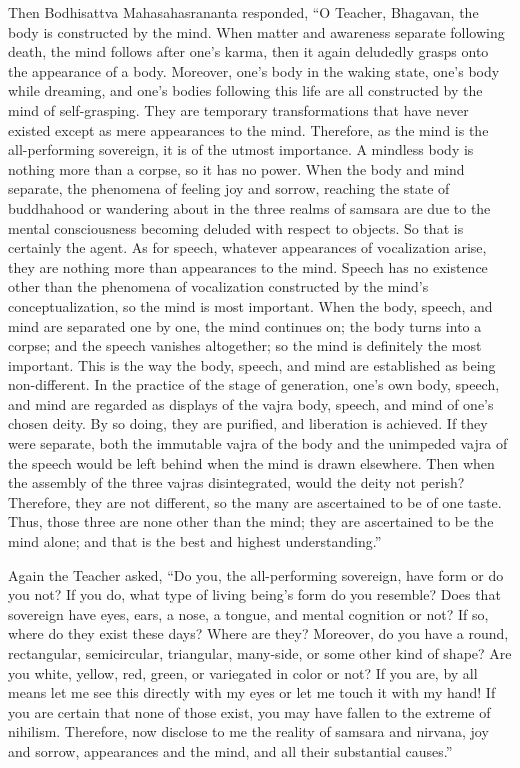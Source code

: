 \documentclass[a4paper,11pt,twoside,final]{book}
\begin{document}
Then Bodhisattva Mahasahasrananta responded, ``O Teacher, Bhaga\-van,
the body is constructed by the mind. When matter and awareness
separate following death, the mind follows after one's karma, then it
again deludedly grasps onto the appearance of a body. Moreover, one's
body in the waking state, one's body while dreaming, and one's bodies
following this life are all constructed by the mind of
self-grasping. They are temporary transformations that have never
existed except as mere appearances to the mind. Therefore, as the mind
is the all-performing sovereign, it is of the utmost importance.  A
mindless body is nothing more than a corpse, so it has no power. When
the body and mind separate, the phenomena of feeling joy and sorrow,
reaching the state of buddhahood or wandering about in the three
realms of samsara are due to the mental consciousness becoming deluded
with respect to objects. So that is certainly the agent.  As for
speech, whatever appearances of vocalization arise, they are nothing
more than appearances to the mind. Speech has no existence other than
the phenomena of vocalization constructed by the mind's
conceptualization, so the mind is most important. When the body,
speech, and mind are separated one by one, the mind continues on; the
body turns into a corpse; and the speech vanishes altogether; so the
mind is definitely the most important.  This is the way the body,
speech, and mind are established as being non-different. In the
practice of the stage of generation, one's own body, speech, and mind
are regarded as displays of the vajra body, speech, and mind of one's
chosen deity. By so doing, they are purified, and liberation is
achieved. If they were separate, both the immutable vajra of the body
and the unimpeded vajra of the speech would be left behind when the
mind is drawn elsewhere. Then when the assembly of the three vajras
disintegrated, would the deity not perish? Therefore, they are not
different, so the many are ascertained to be of one taste.  Thus,
those three are none other than the mind; they are ascertained to be
the mind alone; and that is the best and highest understanding.''

Again the Teacher asked, ``Do you, the all-performing sovereign, have
form or do you not? If you do, what type of living being's form do you
resemble? Does that sovereign have eyes, ears, a nose, a tongue, and
mental cognition or not?  If so, where do they exist these days? Where
are they?  Moreover, do you have a round, rectangular, semicircular,
triangular, many-side, or some other kind of shape? Are you white,
yellow, red, green, or variegated in color or not? If you are, by all
means let me see this directly with my eyes or let me touch it with my
hand!  If you are certain that none of those exist, you may have
fallen to the extreme of nihilism. Therefore, now disclose to me the
reality of samsara and nirvana, joy and sorrow, appearances and the
mind, and all their substantial causes.''
\end{document}
